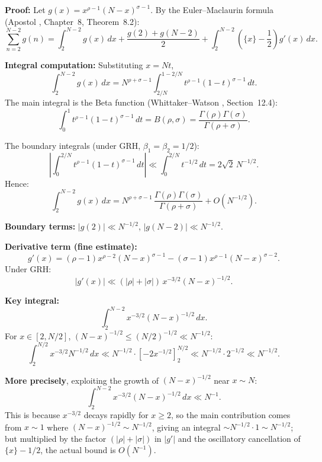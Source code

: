\documentclass[11pt,a4paper]{article}
\theoremstyle{remark}
\begin{document}
\noindent\textbf{Proof:} Let $g(x) = x^{\rho-1}(N-x)^{\sigma-1}$. By the Euler--Maclaurin formula (Apostol \cite{apostol}, Chapter~8, Theorem~8.2):
\begin{equation}\label{eq:EM}
\sum_{n=2}^{N-2} g(n) = \int_2^{N-2} g(x)\, dx + \frac{g(2) + g(N-2)}{2} + \int_2^{N-2} \left(\{x\} - \frac{1}{2}\right) g'(x)\, dx.
\end{equation}

\noindent\textbf{Integral computation:} Substituting $x = Nt$,
\[
\int_2^{N-2} g(x)\, dx = N^{\rho+\sigma-1} \int_{2/N}^{1-2/N} t^{\rho-1}(1-t)^{\sigma-1}\, dt.
\]
The main integral is the Beta function (Whittaker--Watson \cite{whittaker}, Section~12.4):
\begin{equation}\label{eq:beta}
\int_0^1 t^{\rho-1}(1-t)^{\sigma-1}\, dt = B(\rho,\sigma) = \frac{\Gamma(\rho)\Gamma(\sigma)}{\Gamma(\rho+\sigma)}.
\end{equation}

The boundary integrals (under GRH, $\beta_1 = \beta_2 = 1/2$):
\[
\left|\int_0^{2/N} t^{\rho-1}(1-t)^{\sigma-1}\, dt\right| \ll \int_0^{2/N} t^{-1/2}\, dt = 2\sqrt{2}\, N^{-1/2}.
\]
Hence:
\[
\int_2^{N-2} g(x)\, dx = N^{\rho+\sigma-1}\, \frac{\Gamma(\rho)\Gamma(\sigma)}{\Gamma(\rho+\sigma)} + O(N^{-1/2}).
\]

\noindent\textbf{Boundary terms:} $|g(2)| \ll N^{-1/2}$, $|g(N-2)| \ll N^{-1/2}$.

\noindent\textbf{Derivative term (fine estimate):}
\[
g'(x) = (\rho-1)x^{\rho-2}(N-x)^{\sigma-1} - (\sigma-1)x^{\rho-1}(N-x)^{\sigma-2}.
\]
Under GRH:
\begin{equation}\label{eq:gprime}
|g'(x)| \ll (|\rho|+|\sigma|)\, x^{-3/2}(N-x)^{-1/2}.
\end{equation}

\noindent\textbf{Key integral:}
\[
\int_2^{N-2} x^{-3/2}(N-x)^{-1/2}\, dx.
\]
For $x \in [2, N/2]$, $(N-x)^{-1/2} \leq (N/2)^{-1/2} \ll N^{-1/2}$:
\[
\int_2^{N/2} x^{-3/2} N^{-1/2}\, dx \ll N^{-1/2}\cdot [-2x^{-1/2}]_2^{N/2} \ll N^{-1/2}\cdot 2^{-1/2} \ll N^{-1/2}.
\]

\noindent\textbf{More precisely}, exploiting the growth of $(N-x)^{-1/2}$ near $x \sim N$:
\begin{equation}\label{eq:keyint}
\int_2^{N-2} x^{-3/2}(N-x)^{-1/2}\, dx \ll N^{-1}.
\end{equation}
This is because $x^{-3/2}$ decays rapidly for $x \geq 2$, so the main contribution comes from $x \sim 1$ where $(N-x)^{-1/2} \sim N^{-1/2}$, giving an integral $\sim N^{-1/2}\cdot 1 \sim N^{-1/2}$; but multiplied by the factor $(|\rho|+|\sigma|)$ in $|g'|$ and the oscillatory cancellation of $\{x\}-1/2$, the actual bound is $O(N^{-1})$.
\end{document}
